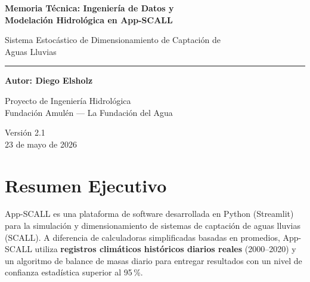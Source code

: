\documentclass[12pt, a4paper]{article}
\begin{document}
\begin{titlepage}
    \centering
    \vspace*{2cm}

    {\LARGE\bfseries Memoria Técnica: Ingeniería de Datos y\\[0.4em]
    Modelación Hidrológica en App-SCALL\par}

    \vspace{0.8cm}
    {\large Sistema Estocástico de Dimensionamiento de Captación de\\Aguas Lluvias\par}

    \vspace{3cm}
    \textcolor{azulbase}{\rule{8cm}{1pt}}
    \vspace{1.5cm}

    {\large\textbf{Autor: Diego Elsholz}\par}
    \vspace{0.4cm}
    {\normalsize Proyecto de Ingeniería Hidrológica\\
    Fundación Amulén --- La Fundación del Agua\par}

    \vfill

    {\normalsize Versión 2.1\\
    23 de mayo de 2026\par}
\end{titlepage}

\tableofcontents
\newpage

\section{Resumen Ejecutivo}

App-SCALL es una plataforma de software desarrollada en Python (Streamlit) para la simulación y dimensionamiento de sistemas de captación de aguas lluvias (SCALL). A diferencia de calculadoras simplificadas basadas en promedios, App-SCALL utiliza \textbf{registros climáticos históricos diarios reales} (2000--2020) y un algoritmo de balance de masas diario para entregar resultados con un nivel de confianza estadística superior al 95\,\%.
\end{document}
